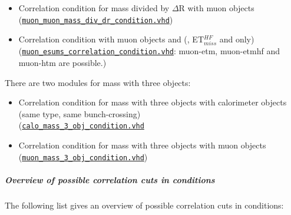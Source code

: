 \begin{itemize}
\item Correlation condition for mass divided by $\Delta$R with muon objects\\
(\href{https://github.com/cms-l1-globaltrigger/mp7_ugt_legacy/tree/master/firmware/hdl/gt_mp7_core/gtl_fdl_wrapper/gtl/muon_muon_mass_div_dr_condition.vhd}{\texttt{muon\_muon\_mass\_div\_dr\_condition.vhd}})
\item Correlation condition with muon objects and \esums (\etm, ET$_{miss}^{HF}$ and \htm only)\\
(\href{https://github.com/cms-l1-globaltrigger/mp7_ugt_legacy/tree/master/firmware/hdl/gt_mp7_core/gtl_fdl_wrapper/gtl/muon_esums_correlation_condition.vhd}{\texttt{muon\_esums\_correlation\_condition.vhd}}: muon-etm, muon-etmhf and muon-htm are possible.)
\end{itemize}

There are two modules for mass with three objects:
\begin{itemize}
\item Correlation condition for mass with three objects with calorimeter objects (same type, same bunch-crossing)\\
(\href{https://github.com/cms-l1-globaltrigger/mp7_ugt_legacy/tree/master/firmware/hdl/gt_mp7_core/gtl_fdl_wrapper/gtl/calo_mass_3_obj_condition.vhd}{\texttt{calo\_mass\_3\_obj\_condition.vhd}}
\item Correlation condition for mass with three objects with muon objects\\
(\href{https://github.com/cms-l1-globaltrigger/mp7_ugt_legacy/tree/master/firmware/hdl/gt_mp7_core/gtl_fdl_wrapper/gtl/muon_mass_3_obj_condition.vhd}{\texttt{muon\_mass\_3\_obj\_condition.vhd}})
\end{itemize}

\subparagraph{Overview of possible correlation cuts in conditions}
\label{sec:gtl:overview_correlation_cuts}

The following list gives an overview of possible correlation cuts in conditions:

